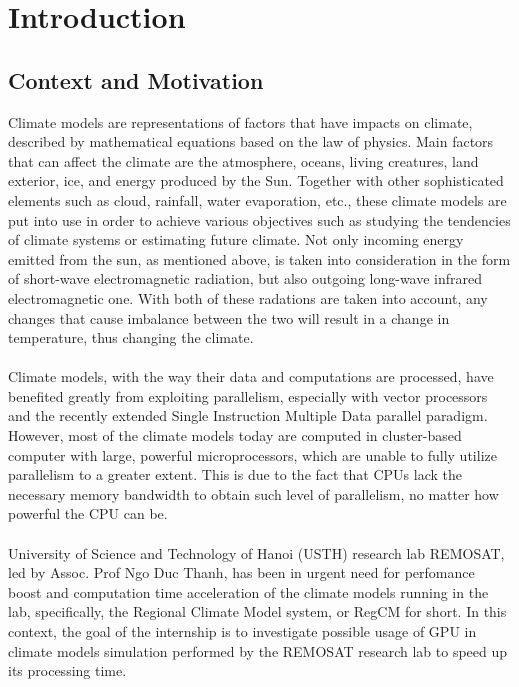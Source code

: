 \chapter{Introduction}

\section{Context and Motivation}

Climate models are representations of factors that have impacts on climate, described by mathematical equations based on the law of physics. Main factors that can affect the climate are the atmosphere, oceans, living creatures, land exterior, ice, and energy produced by the Sun. Together with other sophisticated elements such as cloud, rainfall, water evaporation, etc., these climate models are put into use in order to achieve various objectives such as studying the tendencies of climate systems or estimating future climate. Not only incoming energy emitted from the sun, as mentioned above, is taken into consideration in the form of short-wave electromagnetic radiation, but also outgoing long-wave infrared electromagnetic one. With both of these radations are taken into account, any changes that cause imbalance between the two will result in a change in temperature, thus changing the climate. \\
~\\
Climate models, with the way their data and computations are processed, have benefited greatly from exploiting parallelism, especially with vector processors and the recently extended Single Instruction Multiple Data parallel paradigm. However, most of the climate models today are computed in cluster-based computer with large, powerful microprocessors, which are unable to fully utilize parallelism to a greater extent. This is due to the fact that CPUs lack the necessary memory bandwidth to obtain such level of parallelism, no matter how powerful the CPU can be.\\
~\\
University of Science and Technology of Hanoi (USTH) research lab REMOSAT, led by Assoc. Prof Ngo Duc Thanh, has been in urgent need for perfomance boost and computation time acceleration of the climate models running in the lab, specifically, the Regional Climate Model system, or RegCM for short. In this context, the goal of the internship is to investigate possible usage of GPU in climate models simulation performed by the REMOSAT research lab to speed up its processing time.\\


